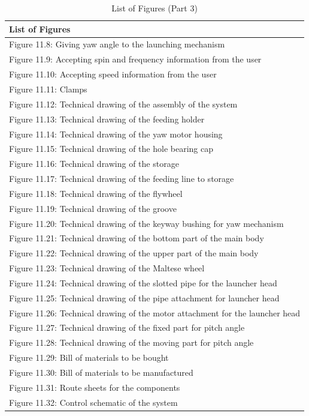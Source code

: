 \documentclass[12pt]{report}
\begin{document}
\begin{table}[h!]
\centering
\begin{tabular}{|p{15cm}|}
\hline
\textbf{List of Figures} \\ \hline
Figure 11.8: Giving yaw angle to the launching mechanism\\ \hline
Figure 11.9: Accepting spin and frequency information from the user\\ \hline
Figure 11.10: Accepting speed information from the user\\ \hline
Figure 11.11: Clamps\\ \hline
Figure 11.12: Technical drawing of the assembly of the system\\ \hline
Figure 11.13: Technical drawing of the feeding holder\\ \hline
Figure 11.14: Technical drawing of the yaw motor housing\\ \hline
Figure 11.15: Technical drawing of the hole bearing cap\\ \hline
Figure 11.16: Technical drawing of the storage\\ \hline
Figure 11.17: Technical drawing of the feeding line to storage\\ \hline
Figure 11.18: Technical drawing of the flywheel\\ \hline
Figure 11.19: Technical drawing of the groove\\ \hline
Figure 11.20: Technical drawing of the keyway bushing for yaw mechanism\\ \hline
Figure 11.21: Technical drawing of the bottom part of the main body\\ \hline
Figure 11.22: Technical drawing of the upper part of the main body\\ \hline
Figure 11.23: Technical drawing of the Maltese wheel\\ \hline
Figure 11.24: Technical drawing of the slotted pipe for the launcher head\\ \hline
Figure 11.25: Technical drawing of the pipe attachment for launcher head\\ \hline
Figure 11.26: Technical drawing of the motor attachment for the launcher head\\ \hline
Figure 11.27: Technical drawing of the fixed part for pitch angle\\ \hline
Figure 11.28: Technical drawing of the moving part for pitch angle\\ \hline
Figure 11.29: Bill of materials to be bought\\ \hline
Figure 11.30: Bill of materials to be manufactured\\ \hline
Figure 11.31: Route sheets for the components\\ \hline
Figure 11.32: Control schematic of the system\\ \hline


\end{tabular}

\caption{List of Figures (Part 3)}
\label{tab:list_of_figures_part3}
\end{table}
\end{document}
